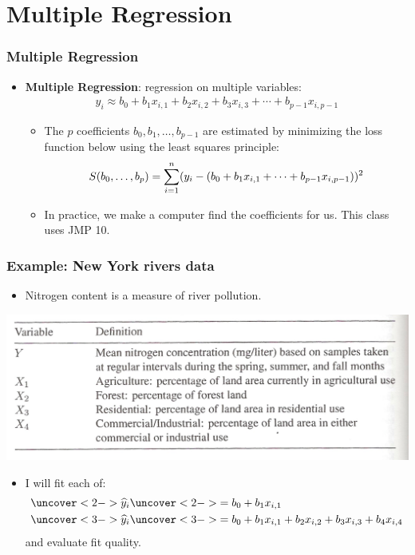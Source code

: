 \documentclass[handout]{beamer}\usepackage{graphicx, color}
\providecommand{\wh}[1]{\widehat{#1}}
\numberwithin{equation}{section}
\begin{document}
\section{Multiple Regression}

\begin{frame}
\frametitle{Multiple Regression}
\begin{itemize}
\pause \item {\bf Multiple Regression}: regression on multiple variables:
\pause \begin{align*}
y_i \approx b_0 + b_1 x_{i, 1} + b_2 x_{i, 2} + b_3 x_{i,3} + \cdots + b_{p-1} x_{i, {p-1}}
\end{align*}
\begin{itemize}
\pause \item The $p$ coefficients $b_0, b_1, \ldots, b_{p-1}$ are estimated by minimizing the loss function below using the least squares principle:
\pause \begin{align*} \scriptsize
S(b_0, \ldots, b_p) = \sum_{i = 1}^n (y_i -  (b_0 + b_1 x_{i, 1} + \cdots + b_{p-1} x_{i,p-1}))^2
\end{align*}
\pause \item In practice, we make a computer find the coefficients for us. This class uses JMP 10.
\end{itemize}
\end{itemize}
\end{frame}


\begin{frame}
\frametitle{Example: New York rivers data}
\begin{itemize}
\item Nitrogen content is a measure of river pollution. 
\end{itemize}
 \includegraphics{../../fig/riversdefs.png}
\begin{itemize}
\pause \item I will fit each of:
\begin{align*}
\uncover<2->{\wh{y}_i} & \uncover<2->{= b_0 + b_1 x_{i, 1}} \\
\uncover<3->{\wh{y}_i }& \uncover<3->{= b_0 + b_1 x_{i, 1} + b_2 x_{i, 2}+ b_3 x_{i, 3}+ b_4 x_{i, 4}}
\end{align*}
\pause \pause and evaluate fit quality.
\end{itemize}
\end{frame}
\end{document}
